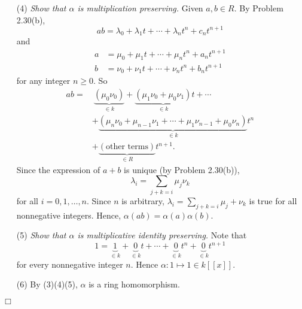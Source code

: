 \documentclass{article}
\begin{document}
\begin{enumerate}
\item[(4)]
  \emph{Show that $\alpha$ is multiplication preserving.}
  Given $a, b \in R$. By Problem 2.30(b),
  \[
    ab
    = \lambda_0 + \lambda_1 t + \cdots + \lambda_n t^n + c_n t^{n+1}
  \]
  and
  \begin{align*}
    a
    &= \mu_0 + \mu_1 t + \cdots + \mu_n t^n + a_n t^{n+1} \\
    b
    &= \nu_0 + \nu_1 t + \cdots + \nu_n t^n + b_n t^{n+1}
  \end{align*}
  for any integer $n \geq 0$.
  So
  \begin{align*}
    ab
    =& \: \underbrace{(\mu_0 \nu_0)}_{\in k}
      + \underbrace{(\mu_1 \nu_0 + \mu_0 \nu_1)}_{\in k} t + \cdots \\
      &+ \underbrace{(\mu_n \nu_0 + \mu_{n-1}\nu_1 + \cdots + \mu_1\nu_{n-1} + \mu_0\nu_n)}_{\in k} t^n \\
      &+ \underbrace{(\text{other terms})}_{\in R} t^{n+1}.
  \end{align*}
  Since the expression of $a+b$ is unique (by Problem 2.30(b)),
  \[
    \lambda_i = \sum_{j+k=i} \mu_j \nu_k
  \]
  for all $i = 0, 1, \ldots, n$.
  Since $n$ is arbitrary, $\lambda_i = \sum_{j+k=i} \mu_j + \nu_k$ is true for all nonnegative integers.
  Hence, $\alpha(ab) = \alpha(a)\alpha(b)$.

\item[(5)]
  \emph{Show that $\alpha$ is multiplicative identity preserving.}
  Note that
  \[
    1
    = \underbrace{1}_{\in k}
      + \underbrace{0}_{\in k} t + \cdots
      + \underbrace{0}_{\in k} t^n
      + \underbrace{0}_{\in k} t^{n+1}
  \]
  for every nonnegative integer $n$.
  Hence $\alpha: 1 \mapsto 1 \in k[[x]]$.

\item[(6)]
  By (3)(4)(5), $\alpha$ is a ring homomorphism.
\end{enumerate}
$\Box$ \\
\end{document}
